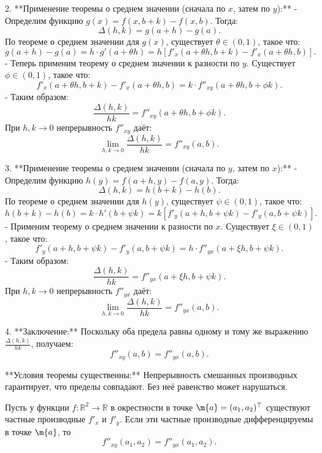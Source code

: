 2. **Применение теоремы о среднем значении (сначала по \( x \), затем по \( y \)):**  
   - Определим функцию \( g(x) = f(x, b + k) - f(x, b) \). Тогда:  
     \[
     \Delta(h, k) = g(a + h) - g(a).
     \]  
     По теореме о среднем значении для \( g(x) \), существует \( \theta \in (0, 1) \), такое что:  
     \[
     g(a + h) - g(a) = h \cdot g'(a + \theta h) = h \left[ f'_x(a + \theta h, b + k) - f'_x(a + \theta h, b) \right].
     \]  
   - Теперь применим теорему о среднем значении к разности по \( y \). Существует \( \phi \in (0, 1) \), такое что:  
     \[
     f'_x(a + \theta h, b + k) - f'_x(a + \theta h, b) = k \cdot f''_{xy}(a + \theta h, b + \phi k).
     \]  
   - Таким образом:  
     \[
     \frac{\Delta(h, k)}{hk} = f''_{xy}(a + \theta h, b + \phi k).
     \]  
     При \( h, k \to 0 \) непрерывность \( f''_{xy} \) даёт:  
     \[
     \lim_{h, k \to 0} \frac{\Delta(h, k)}{hk} = f''_{xy}(a, b).
     \]

3. **Применение теоремы о среднем значении (сначала по \( y \), затем по \( x \)):**  
   - Определим функцию \( h(y) = f(a + h, y) - f(a, y) \). Тогда:  
     \[
     \Delta(h, k) = h(b + k) - h(b).
     \]  
     По теореме о среднем значении для \( h(y) \), существует \( \psi \in (0, 1) \), такое что:  
     \[
     h(b + k) - h(b) = k \cdot h'(b + \psi k) = k \left[ f'_y(a + h, b + \psi k) - f'_y(a, b + \psi k) \right].
     \]  
   - Применим теорему о среднем значении к разности по \( x \). Существует \( \xi \in (0, 1) \), такое что:  
     \[
     f'_y(a + h, b + \psi k) - f'_y(a, b + \psi k) = h \cdot f''_{yx}(a + \xi h, b + \psi k).
     \]  
   - Таким образом:  
     \[
     \frac{\Delta(h, k)}{hk} = f''_{yx}(a + \xi h, b + \psi k).
     \]  
     При \( h, k \to 0 \) непрерывность \( f''_{yx} \) даёт:  
     \[
     \lim_{h, k \to 0} \frac{\Delta(h, k)}{hk} = f''_{yx}(a, b).
     \]

4. **Заключение:**  
   Поскольку оба предела равны одному и тому же выражению \( \frac{\Delta(h, k)}{hk} \), получаем:  
   \[
   f''_{xy}(a, b) = f''_{yx}(a, b).
   \]  

**Условия теоремы существенны:** Непрерывность смешанных производных гарантирует, что пределы совпадают. Без неё равенство может нарушаться.




\begin{theorem}[Юнг]\label{Yong}
    Пусть у функции $f:\mathbb{R}^2 \to \mathbb{R}$ в окрестности в точке $\m{a} = (a_1,a_2)^\top$ существуют частные производные $f'_{x}$ и $f'_{y}$. Если эти частные производные дифференцируемы в точке $\m{a}$, то
    \[
     f''_{xy}(a_1,a_2) = f''_{yx}(a_1,a_2).
    \]
\end{theorem}

